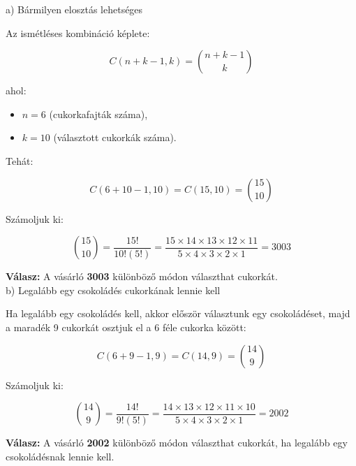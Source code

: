 \begin{solution}
{a) Bármilyen elosztás lehetséges}

Az ismétléses kombináció képlete:

\[
C(n+k-1,k)=\binom{n+k-1}{k}
\]

ahol: 
\begin{itemize}
\item $n=6$ (cukorkafajták száma), 
\item $k=10$ (választott cukorkák száma). 
\end{itemize}
Tehát:

\[
C(6+10-1,10)=C(15,10)=\binom{15}{10}
\]

Számoljuk ki:

\[
\binom{15}{10}=\frac{15!}{10!(5!)}=\frac{15\times14\times13\times12\times11}{5\times4\times3\times2\times1}=3003
\]

\textbf{Válasz:} A vásárló \textbf{3003} különböző módon választhat
cukorkát.\\

{b) Legalább egy csokoládés cukorkának lennie kell}

Ha legalább egy csokoládés kell, akkor először választunk egy csokoládéset,
majd a maradék 9 cukorkát osztjuk el a 6 féle cukorka között:

\[
C(6+9-1,9)=C(14,9)=\binom{14}{9}
\]

Számoljuk ki:

\[
\binom{14}{9}=\frac{14!}{9!(5!)}=\frac{14\times13\times12\times11\times10}{5\times4\times3\times2\times1}=2002
\]

\textbf{Válasz:} A vásárló \textbf{2002} különböző módon választhat
cukorkát, ha legalább egy csokoládésnak lennie kell.
\end{solution}
